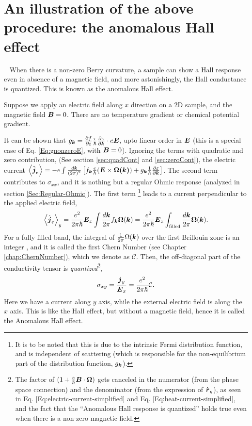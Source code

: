 \documentclass{report}
\renewcommand\vec[1]{\ensuremath\boldsymbol{#1}} %
\begin{document}
\section{An illustration of the above procedure: the anomalous Hall effect}~\label{sec:AHE}
When there is a non-zero Berry curvature, a sample can show a Hall response even in absence of a magnetic field, and more astonishingly, the Hall conductance is quantized. This is known as the anomalous Hall effect.

Suppose we apply an electric field along $x$ direction on a 2D sample, and the magnetic field $\vec{B} = 0$. There are no temperature gradient or chemical potential gradient.

It can be shown that  $g_{\vec{k}} = \frac{\partial f} {\partial \varepsilon}
\frac{\tau}{\hbar} \frac{\partial \varepsilon}{\partial \vec{k}}\cdot e \vec{E}$, upto linear order in $\vec{E}$ (this is a special case of Eq. \eqref{Eq:gnonzeroE}, with $\vec{B} = 0$). Ignoring the terms with quadratic and zero contribution, (See section \ref{sec:quadCont} and \ref{sec:zeroCont}), the electric current $\expval{\hat{\vec{j}}_e} = -e \int \frac{d\vec{k}}{(2\pi)^2} \left[{f}_{\vec{k}} \frac{e}{\hbar} (\vec{E}\times\vec{\Omega(\vec{k})}) + {g}_{\vec{k}} \frac{1}{\hbar} \frac{\partial \varepsilon}{\partial \vec{k}}\right] $. The second term contributes to $\sigma_{xx}$, and it is nothing but a regular Ohmic response (analyzed in section \ref{Sec:Regular-Ohmic}). The first term \footnote{It is to be noted that this is due to the intrinsic Fermi distribution function, and is independent of scattering (which is responsible for the non-equilibrium part of the distribution function, ${g}_{\vec{k}}$).} leads to a current perpendicular to the applied electric field,
$$\expval{\hat{\vec{j}}_e}_y = \frac{e^2}{2 \pi \hbar} \vec{E}_x \int \frac{d\vec{k}}{2\pi} {f}_{\vec{k}} \vec{\Omega}(\vec{k}) = \frac{e^2}{2 \pi \hbar} \vec{E}_x \int_{\text{filled}} \frac{d\vec{k}}{2\pi} \vec{\Omega}(\vec{k}).$$
For a fully filled band, the integral of $\frac{1}{2\pi}\Omega(\vec{k})$ over the first Brillouin zone is an integer \cite{cite:something}, and it is called the first Chern Number (see Chapter \ref{chap:ChernNumber}), which we denote as $\mathcal{C}$. Then, the off-diagonal part of the conductivity tensor is \textit{quantized}\footnote{The factor of $(1 + \frac{e}{\hbar} \vec{B}\cdot\vec{\Omega})$ gets canceled in the numerator (from the phase space connection) and the denominator (from the expression of $\dot{\vec{r}}_{_{\vec{k}}}$), as seen in Eq. \eqref{Eq:electric-current-simplified} and Eq. \eqref{Eq:heat-current-simplified}, and the fact that the ``Anomalous Hall response is quantized'' holds true even when there is a non-zero magnetic field.},
$$\sigma_{xy} = \frac{\vec{j}_y}{\vec{E}_x} = \frac{e^2}{2\pi \hbar} \mathcal{C}.$$
Here we have a current along $y$ axis, while the external electric field is along the $x$ axis. This is like the Hall effect, but without a magnetic field, hence it is called the Anomalous Hall effect.
 
\end{document}
